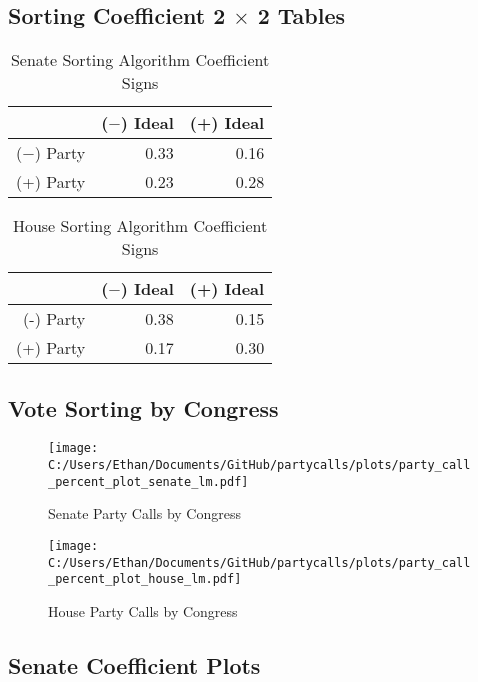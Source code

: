 \documentclass[12pt]{article}
\begin{document}
\subsection{Sorting Coefficient 2 $ \times $ 2 Tables}

\begin{table}[ht]
	\centering
	\caption{Senate Sorting Algorithm Coefficient Signs}
	\begin{tabular}{rrr}
		\hline
		& ($-$) Ideal & (+) Ideal \\ 
		\hline
		($-$) Party & 0.33 & 0.16 \\ 
		(+) Party & 0.23 & 0.28 \\ 
		\hline
	\end{tabular}
\end{table}

\begin{table}[ht]
	\centering
	\caption{House Sorting Algorithm Coefficient Signs}
	\begin{tabular}{rrr}
		\hline
		& ($-$) Ideal & (+) Ideal \\ 
		\hline
		(-) Party & 0.38 & 0.15 \\ 
		(+) Party & 0.17 & 0.30 \\ 
		\hline
	\end{tabular}
\end{table}

\clearpage

\subsection{Vote Sorting by Congress}

\begin{figure}[h]
	\centering
	\caption{Senate Party Calls by Congress}
	\texttt{[image: C:/Users/Ethan/Documents/GitHub/partycalls/plots/party\_call\_percent\_plot\_senate\_lm.pdf]}
\end{figure}


\begin{figure}[h]
	\centering
	\caption{House Party Calls by Congress}
	\texttt{[image: C:/Users/Ethan/Documents/GitHub/partycalls/plots/party\_call\_percent\_plot\_house\_lm.pdf]}
\end{figure}


\clearpage

\subsection{Senate Coefficient Plots}
\end{document}
